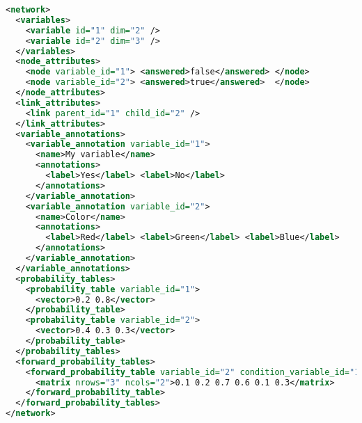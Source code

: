 \clearpage
\begin{lstlisting}[language=XML,
label=lst:arch_and_mod:net_persistence:bnxml]
<network>                                                                                                             
  <variables> 
    <variable id="1" dim="2" />
    <variable id="2" dim="3" />
  </variables>
  <node_attributes>
    <node variable_id="1"> <answered>false</answered> </node>
    <node variable_id="2"> <answered>true</answered>  </node>
  </node_attributes> 
  <link_attributes>
    <link parent_id="1" child_id="2" />
  </link_attributes>
  <variable_annotations>
    <variable_annotation variable_id="1">
      <name>My variable</name>
      <annotations>
        <label>Yes</label> <label>No</label>
      </annotations>
    </variable_annotation>
    <variable_annotation variable_id="2">
      <name>Color</name>
      <annotations>
        <label>Red</label> <label>Green</label> <label>Blue</label>
      </annotations>
    </variable_annotation>
  </variable_annotations>
  <probability_tables>
    <probability_table variable_id="1">
      <vector>0.2 0.8</vector>
    </probability_table>
    <probability_table variable_id="2">
      <vector>0.4 0.3 0.3</vector>
    </probability_table>
  </probability_tables>
  <forward_probability_tables>
    <forward_probability_table variable_id="2" condition_variable_id="1">
      <matrix nrows="3" ncols="2">0.1 0.2 0.7 0.6 0.1 0.3</matrix>
    </forward_probability_table>
  </forward_probability_tables>
</network>
\end{lstlisting}
